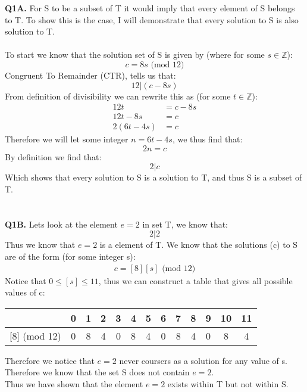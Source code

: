 \documentclass[11pt]{article}
\begin{document}
\parindent=0pt

\textbf{Q1A.} For S to be a subset of T it would imply that every element of S belongs to T. To show this is the case, I will demonstrate that every solution to S is also solution to T.\\\\
To start we know that the solution set of S is given by (where for some $s \in \mathbb{Z}$):
\[ c = 8s \text{ (mod 12)} \]
Congruent To Remainder (CTR), tells us that:
\[ 12|(c - 8s) \]
From definition of divisibility we can rewrite this as (for some $t \in \mathbb{Z}$):
\begin{align*}
12t &= c - 8s \\
 12t - 8s &= c \\
 2(6t - 4s) &= c 
\end{align*}
Therefore we will let some integer $n = 6t - 4s$, we thus find that:
\[ 2n = c \]
By definition we find that:
\[ 2|c \]
Which shows that every solution to S is a solution to T, and thus S is a subset of T. \\\\\\
\textbf{Q1B.} Lets look at the element $e =  2$ in set T, we know that:
\[ 2|2 \]
Thus we know that $e = 2$ is a element of T. We know that the solutions (c) to S are of the form (for some integer s):
\begin{align*}
c = [8][s] \text{ (mod 12)} 
\end{align*}
Notice that $0 \leq [s] \leq 11$, thus we can construct a table that gives all possible values of c:
\begin{center}
 \begin{tabular}{||c | c c c c c c c c c c c c||} 
 \hline
 [s] & 0 & 1 & 2 & 3 & 4 & 5 & 6 & 7 & 8 & 9 & 10 & 11\\ [0.5ex] 
 \hline
 [s][8] (mod 12) & 0 & 8 & 4 & 0 & 8 &  4 & 0 & 8 & 4 & 0 & 8 & 4\\ 
 \hline
\end{tabular}
\end{center}
Therefore we notice that $e= 2$ never coursers as a solution for any value of s. Therefore we know that the set S does not contain $e=2$.\\ Thus we have shown that the element $e=2$ exists within T but not within S.
\end{document}
